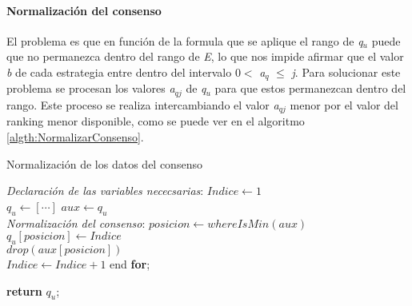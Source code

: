 \paragraph{Normalización del consenso}
El problema es que en función de la formula que se aplique el rango de \textit{q$_{u}$} puede que no permanezca dentro del rango de \textit{E}, lo que nos impide afirmar que el valor \textit{b} de cada estrategia entre dentro del intervalo 0$<$
\textit{a$_{q}$ }$\leq$\textit{ j}. Para solucionar este problema se procesan los valores \textit{a$_{qj}$ } de \textit{q$_{u}$} para que estos permanezcan dentro del rango. Este proceso se realiza intercambiando el valor \textit{a$_{qj}$ } menor por el valor del ranking menor disponible, como se puede ver en el algoritmo \ref{algth:NormalizarConsenso}.

\begin{algorithm}[H]
    \caption{Normalización de los datos del consenso}\label{algth:NormalizarConsenso}
    \begin{algorithmic}[1]
            \BState \emph{Declaración de las variables nececsarias}:
            \State $Indice \gets 1$
            \\
            \State $q_{u} \gets [\cdots]$
            \State $aux \gets q_{u}$
            \\                
            \BState \emph{Normalización del consenso}:
                \State $posicion \gets whereIsMin(aux)$ 
                \\
                \State $q_{u}[posicion] \gets Indice$ 
                \\
                \State $\textit{drop}(aux[posicion])$ 
                \\
                \State $Indice \gets Indice + 1$ 
            \EndFor
            \State end \textbf{for};

            \State \textbf{return} $q_{u}$;

        \EndProcedure
    \end{algorithmic}
\end{algorithm}

